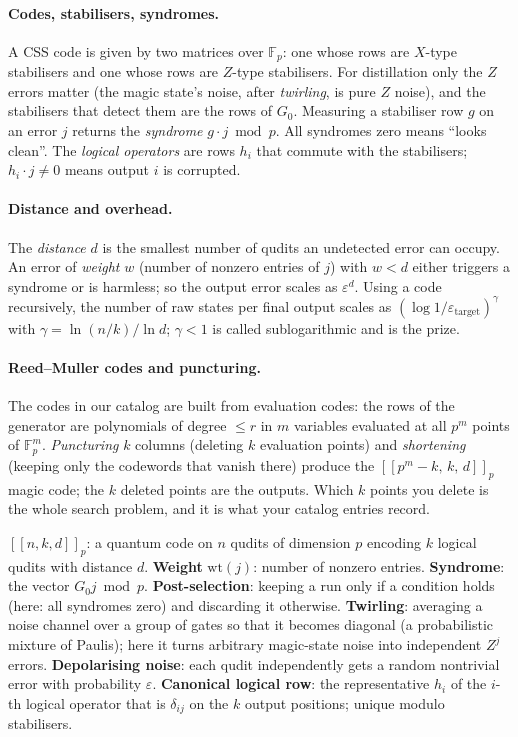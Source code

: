 \documentclass[11pt]{article}
\newcommand{\eps}{\varepsilon}
\newcommand{\F}{\mathbb{F}}
\begin{document}
\paragraph{Codes, stabilisers, syndromes.} A CSS code is given by two matrices over
$\F_p$: one whose rows are $X$-type stabilisers and one whose rows are $Z$-type
stabilisers. For distillation only the $Z$ errors matter (the magic state's noise,
after \emph{twirling}, is pure $Z$ noise), and the stabilisers that detect them are the
rows of $G_0$. Measuring a stabiliser row $g$ on an error $j$ returns the
\emph{syndrome} $g\cdot j \bmod p$. All syndromes zero means ``looks clean''. The
\emph{logical operators} are rows $h_i$ that commute with the stabilisers; $h_i\cdot
j\neq 0$ means output $i$ is corrupted.

\paragraph{Distance and overhead.} The \emph{distance} $d$ is the smallest number of
qudits an undetected error can occupy. An error of \emph{weight} $w$ (number of
nonzero entries of $j$) with $w<d$ either triggers a syndrome or is harmless; so
the output error scales as $\eps^{d}$. Using a code recursively, the number of raw
states per final output scales as $(\log 1/\eps_{\mathrm{target}})^{\gamma}$ with
$\gamma = \ln(n/k)/\ln d$; $\gamma<1$ is called sublogarithmic and is the prize.

\paragraph{Reed--Muller codes and puncturing.} The codes in our catalog are built
from evaluation codes: the rows of the generator are polynomials of degree $\le r$ in
$m$ variables evaluated at all $p^{m}$ points of $\F_p^{m}$. \emph{Puncturing} $k$
columns (deleting $k$ evaluation points) and \emph{shortening} (keeping only the
codewords that vanish there) produce the $[[p^{m}-k,\,k,\,d]]_p$ magic code; the $k$
deleted points are the outputs. Which $k$ points you delete is the whole search
problem, and it is what your catalog entries record.

\begin{vocab}
\textbf{$[[n,k,d]]_p$}: a quantum code on $n$ qudits of dimension $p$ encoding $k$
logical qudits with distance $d$.
\textbf{Weight} $\mathrm{wt}(j)$: number of nonzero entries.
\textbf{Syndrome}: the vector $G_0 j \bmod p$.
\textbf{Post-selection}: keeping a run only if a condition holds (here: all
syndromes zero) and discarding it otherwise.
\textbf{Twirling}: averaging a noise channel over a group of gates so that it becomes
diagonal (a probabilistic mixture of Paulis); here it turns arbitrary magic-state
noise into independent $Z^{j}$ errors.
\textbf{Depolarising noise}: each qudit independently gets a random nontrivial
error with probability $\eps$.
\textbf{Canonical logical row}: the representative $h_i$ of the $i$-th logical
operator that is $\delta_{ij}$ on the $k$ output positions; unique modulo
stabilisers.
\end{vocab}
\end{document}
